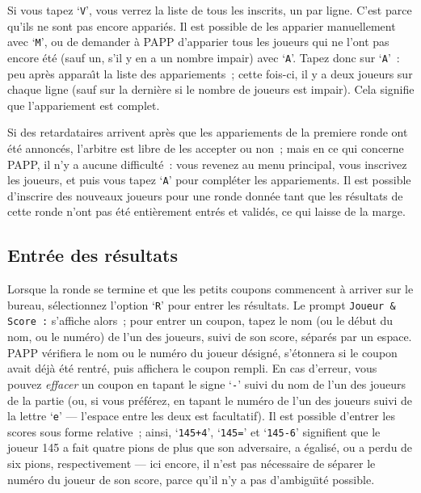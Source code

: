 \documentclass[10pt]{article}
\begin{document}
	Si vous tapez `\verb|V|', vous verrez la liste de tous les
inscrits, un par ligne.  C'est parce qu'ils ne sont pas encore
appari\'es.  Il est possible de les apparier manuellement avec
`\verb|M|', ou de demander \`a PAPP d'apparier tous les joueurs qui ne
l'ont pas encore \'et\'e (sauf un, s'il y en a un nombre impair) avec
`\verb|A|'.  Tapez donc sur `\verb|A|'~: peu apr\`es appara{\^\i}t la
liste des appariements~; cette fois-ci, il y a deux joueurs sur chaque
ligne (sauf sur la derni\`ere si le nombre de joueurs est impair).  Cela
signifie que l'appariement est complet.

Si des retardataires arrivent apr\`es que les appariements de la
premiere ronde ont \'et\'e annonc\'es, l'arbitre est libre de les
accepter ou non~; mais en ce qui concerne PAPP, il n'y a aucune
difficult\'e~: vous revenez au menu principal, vous inscrivez les
joueurs, et puis vous tapez `\verb|A|' pour compl\'eter les appariements. 
Il est possible d'inscrire des nouveaux joueurs pour une ronde donn\'ee
tant que les r\'esultats de cette ronde n'ont pas \'et\'e enti\`erement
entr\'es et valid\'es, ce qui laisse de la marge.

\subsection{Entr\'ee des r\'esultats}

Lorsque la ronde se termine et que les petits coupons commencent \`a 
arriver sur le bureau, s\'electionnez l'option `\verb|R|' pour entrer 
les r\'esultats.  Le prompt \verb|Joueur & Score :| s'affiche alors~; 
pour entrer un coupon, tapez le nom (ou le d\'ebut du nom, ou le 
num\'ero) de l'un des joueurs, suivi de son score, s\'epar\'es par un 
espace. PAPP v\'erifiera le nom ou le num\'ero du joueur d\'esign\'e, 
s'\'etonnera si le coupon avait d\'ej\`a \'et\'e rentr\'e, puis 
affichera le coupon rempli. En cas d'erreur, vous pouvez {\em 
effacer} un coupon en tapant le signe `\verb|-|' suivi du nom de l'un 
des joueurs de la partie (ou, si vous pr\'ef\'erez, en tapant le 
num\'ero de l'un des joueurs suivi de la lettre `\verb|e|' --- 
l'espace entre les deux est facultatif). Il est possible d'entrer les 
scores sous forme relative~; ainsi, `\verb|145+4|', `\verb|145=|' et 
`\verb|145-6|' signifient que le joueur 145 a fait quatre pions de 
plus que son adversaire, a \'egalis\'e, ou a perdu de six pions, 
respectivement --- ici encore, il n'est pas n\'ecessaire de s\'eparer 
le num\'ero du joueur de son score, parce qu'il n'y a pas 
d'ambigu{\"\i}t\'e possible.
\end{document}
